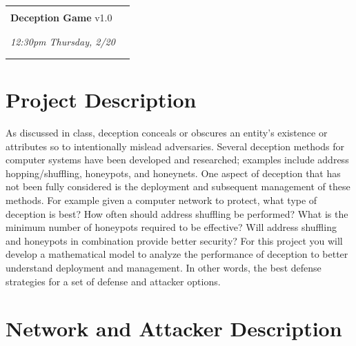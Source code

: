 \documentclass[10pt]{article}
\begin{document}
\newcommand{\dis}{\displaystyle}
\newcommand{\beq}{\begin{eqnarray}}
\newcommand{\eeq}{\end{eqnarray}}


{
 \setlength{\tabcolsep}{0in}
 \noindent
 \begin{tabular*}{\textwidth}{p{5.0in}r}
 \begin{tabular}{l}
 \Large \textbf{CSC 790 A: Project 1} \\
 \Large \textbf{Deception Game} v1.0 \\ \\
 \end{tabular}
 &
  {\renewcommand{\arraystretch}{1.25}
  \setlength{\tabcolsep}{0.1in}
  \begin{tabular}{|l|} \hline
    \textbf{\textsf{Due}} \\ \hline \hline
    \textit{\textsf{12:30pm Thursday, 2/20}} \\ \hline
  \end{tabular}} \\ \\ \hline \hline
\end{tabular*}
}

\section*{Project Description}

\thispagestyle{fancy}

As discussed in class, deception conceals or obscures an entity's existence or attributes so to  intentionally mislead adversaries. Several deception methods for computer systems have been developed and researched; examples include address hopping/shuffling, honeypots,  and honeynets. One aspect of deception that has not been fully considered is the deployment and subsequent management of these methods.  For example given a computer network to protect, what type of deception is best? How often should address shuffling be performed? What is the minimum number of honeypots required to be effective? Will address shuffling and honeypots in combination provide better security? For this project you will develop a mathematical model to analyze the performance of deception to better understand  deployment and management. In other words, the best defense strategies for a set of defense and attacker options.

\section*{Network and Attacker Description}
\end{document}
